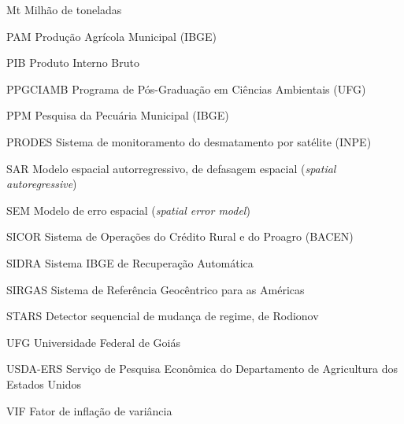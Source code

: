 \begin{siglas}
  \item[Mt] Milhão de toneladas
  \item[PAM] Produção Agrícola Municipal (IBGE)
  \item[PIB] Produto Interno Bruto
  \item[PPGCIAMB] Programa de Pós-Graduação em Ciências Ambientais (UFG)
  \item[PPM] Pesquisa da Pecuária Municipal (IBGE)
  \item[PRODES] Sistema de monitoramento do desmatamento por satélite (INPE)
  \item[SAR] Modelo espacial autorregressivo, de defasagem espacial (\emph{spatial autoregressive})
  \item[SEM] Modelo de erro espacial (\emph{spatial error model})
  \item[SICOR] Sistema de Operações do Crédito Rural e do Proagro (BACEN)
  \item[SIDRA] Sistema IBGE de Recuperação Automática
  \item[SIRGAS] Sistema de Referência Geocêntrico para as Américas
  \item[STARS] Detector sequencial de mudança de regime, de Rodionov
  \item[UFG] Universidade Federal de Goiás
  \item[USDA-ERS] Serviço de Pesquisa Econômica do Departamento de Agricultura dos Estados Unidos
  \item[VIF] Fator de inflação de variância
\end{siglas}
